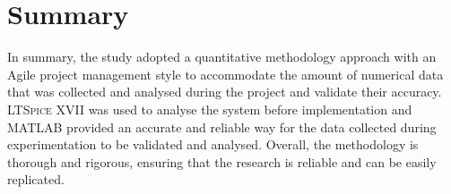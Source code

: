 \documentclass[class=report,11pt,crop=false]{standalone}
\begin{document}

\section{Summary}
In summary, the study adopted a quantitative methodology approach with an Agile project management style to accommodate the amount of numerical data that was collected and analysed during the project and validate their accuracy. \textsc{LTSpice XVII} was used to analyse the system before implementation and \textsc{MATLAB} provided an accurate and reliable way for the data collected during experimentation to be validated and analysed. Overall, the methodology is thorough and rigorous, ensuring that the research is reliable and can be easily replicated.

\ifstandalone

\printnoidxglossary[type=\acronymtype,nonumberlist]
\fi
\end{document}
